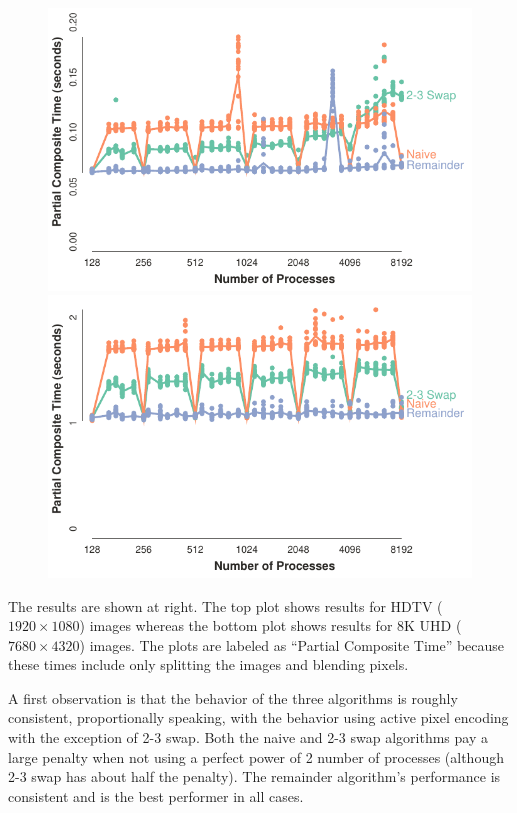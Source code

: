 \documentclass{vgtc}                          %
\newcommand{\textalgorithm}[1]{\textsf{#1}\xspace}
\newcommand{\ttswap}{\textalgorithm{2-3 swap}}
\newcommand{\naive}{\textalgorithm{naive}}
\newcommand{\remainder}{\textalgorithm{remainder}}
\begin{document}
\begin{figure}
  \includegraphics[width=\linewidth]{no-compress-hdtv}
  \includegraphics[width=\linewidth]{no-compress-8k}
\end{figure}
The results are shown at right.
The top plot shows results for HDTV ($1920 \times 1080$) images whereas the bottom plot shows results for 8K UHD ($7680 \times 4320$) images.
The plots are labeled as ``Partial Composite Time'' because these times include only splitting the images and blending pixels.

A first observation is that the behavior of the three algorithms is roughly consistent, proportionally speaking, with the behavior using active pixel encoding with the exception of \ttswap.
Both the \naive and \ttswap algorithms pay a large penalty when not using a perfect power of 2 number of processes (although \ttswap has about half the penalty).
The \remainder algorithm's performance is consistent and is the best performer in all cases.
\end{document}
